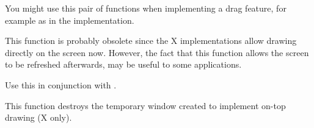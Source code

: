 You might use this pair of functions when implementing a drag feature, for example
as in the  implementation.


This function is probably obsolete since the X implementations
allow drawing directly on the screen now. However, the fact that this
function allows the screen to be refreshed afterwards, may be useful to
some applications.

\label{wxscreendcenddrawingontop}


Use this in conjunction with .

This function destroys the temporary window created to implement on-top drawing (X only).

